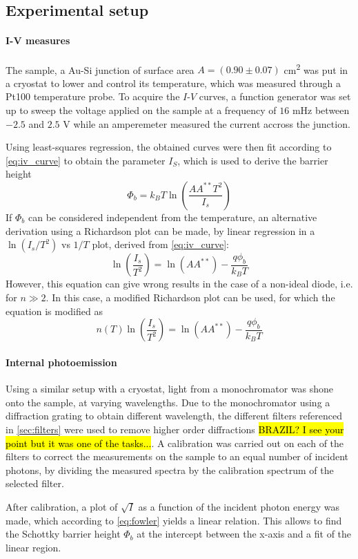 \subsection{Experimental setup}
\paragraph{I-V measures}
The sample, a Au-Si junction of surface area $A = (0.90 \pm 0.07)$ \unit{\cm\squared} was put in a cryostat to lower and control its temperature, which was measured through a Pt100 temperature probe.
To acquire the $I$-$V$ curves, a function generator was set up to sweep the voltage applied on the sample at a frequency of $16$ mHz between $-2.5$ and $2.5$ V while an amperemeter measured the current accross the junction. 

Using least-squares regression, the obtained curves were then fit according to \autoref{eq:iv_curve} to obtain the parameter $I_S$, which is used to derive the barrier height
\begin{equation}
    \Phi_b = k_B T \ln\left(\frac{A A^{**} T^2}{I_s}\right)
\end{equation}
If $\Phi_b$ can be considered independent from the temperature, an alternative derivation using a Richardson plot can be made, by linear regression in a $\ln(I_s/T^2)$ vs $1/T$ plot, derived from \autoref{eq:iv_curve}:
\begin{equation} \label{eq:richardson}
    \ln \left(\frac{I_s}{T^2}\right) = \ln(A A^{**}) - \frac{q \phi_b}{k_B T}
\end{equation}
However, this equation can give wrong results in the case of a non-ideal diode, i.e. for $n \gg 2$. In this case, a modified Richardson plot can be used, for which the equation is modified as \cite{bhuiyan_new_1988}
\begin{equation} \label{eq:modified_richardson}
    n(T) \ln \left(\frac{I_s}{T^2}\right) = \ln(A A^{**}) - \frac{q \phi_b}{k_B T}
\end{equation}

\paragraph{Internal photoemission}
Using a similar setup with a cryostat, light from a monochromator was shone onto the sample, at varying wavelengths.
Due to the monochromator using a diffraction grating to obtain different wavelength, the different filters referenced in \autoref{sec:filters} were used to remove higher order diffractions \hl{BRAZIL? I see your point but it was one of the tasks...}.
A calibration was carried out on each of the filters to correct the measurements on the sample to an equal number of incident photons, by dividing the measured spectra by the calibration spectrum of the selected filter.

After calibration, a plot of $\sqrt{I}$ as a function of the incident photon energy was made, which according to \autoref{eq:fowler} yields a linear relation.
This allows to find the Schottky barrier height $\Phi_b$ at the intercept between the x-axis and a fit of the linear region.
